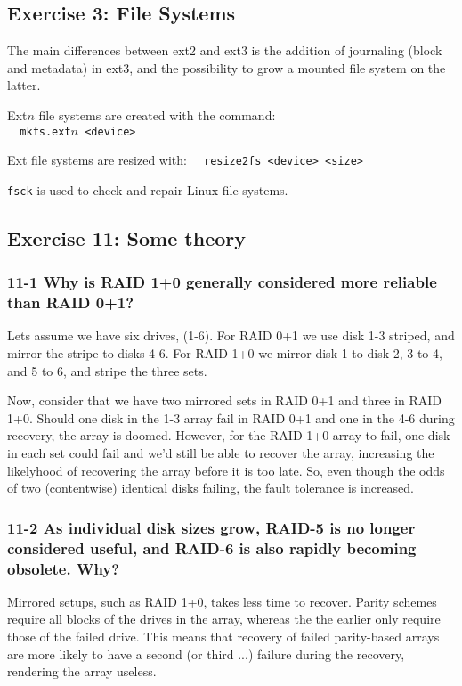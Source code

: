 \subsection{Exercise 3: File Systems}

The main differences between ext2 and ext3 is the addition of journaling (block and metadata) in ext3, and the possibility to grow a mounted file system on the latter.

Ext$n$ file systems are created with the command: \\
\verb=  mkfs.ext=$n$\verb= <device>=

Ext file systems are resized with:
\verb=  resize2fs <device> <size>=

\verb=fsck= is used to check and repair Linux file systems.

\subsection{Exercise 11: Some theory}
\subsubsection{11-1 Why is RAID 1+0 generally considered more reliable than RAID 0+1?}
Lets assume we have six drives, (1-6). For RAID 0+1 we use disk 1-3 striped, and mirror the stripe to disks 4-6. For RAID 1+0 we mirror disk 1 to disk 2, 3 to 4, and 5 to 6, and stripe the three sets.

Now, consider that we have two mirrored sets in RAID 0+1 and three in RAID 1+0. Should one disk in the 1-3 array fail in RAID 0+1 and one in the 4-6 during recovery, the array is doomed. However, for the RAID 1+0 array to fail, one disk in each set could fail and we'd still be able to recover the array, increasing the likelyhood of recovering the array before it is too late. So, even though the odds of two (contentwise) identical disks failing, the fault tolerance is increased.

\subsubsection{11-2 As individual disk sizes grow, RAID-5 is no longer considered useful, and RAID-6 is also rapidly becoming obsolete. Why?}
Mirrored setups, such as RAID 1+0, takes less time to recover. Parity schemes require all blocks of the drives in the array, whereas the the earlier only require those of the failed drive. This means that recovery of failed parity-based arrays are more likely to have a second (or third ...) failure during the recovery, rendering the array useless.

